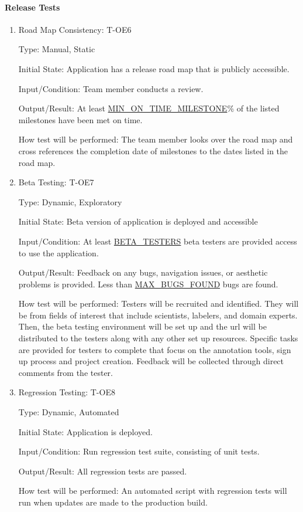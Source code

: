 \documentclass[12pt, titlepage]{article}
\begin{document}
\paragraph{Release Tests}

\begin{enumerate}

\item{Road Map Consistency: T-OE6\\}

Type: Manual, Static
					
Initial State: Application has a release road map that is publicly accessible.
					
Input/Condition: Team member conducts a review.
					
Output/Result: At least \hyperref[MIN_ON_TIME_MILESTONE]{MIN\_ON\_TIME\_MILESTONE}\% of the listed milestones have been met on time.
					
How test will be performed: The team member looks over the road map and cross references the completion date of milestones to the dates listed in the road map.

\item{Beta Testing: T-OE7\\}

Type: Dynamic, Exploratory
					
Initial State: Beta version of application is deployed and accessible
					
Input/Condition: At least \hyperref[BETA_TESTERS]{BETA\_TESTERS} beta testers are provided access to use the application.
					
Output/Result: Feedback on any bugs, navigation issues, or aesthetic problems is provided. Less than \hyperref[MAX_BUGS_FOUND]{MAX\_BUGS\_FOUND} bugs are found.
					
How test will be performed: Testers will be recruited and identified. They will be from fields of interest that include scientists, labelers, and domain experts. Then, the beta testing environment will be set up and the url will be distributed to the testers along with any other set up resources. Specific tasks are provided for testers to complete that focus on the annotation tools, sign up process and project creation. Feedback will be collected through direct comments from the tester.

\item{Regression Testing: T-OE8\\}

Type: Dynamic, Automated
					
Initial State: Application is deployed.
					
Input/Condition: Run regression test suite, consisting of unit tests.
					
Output/Result: All regression tests are passed.
					
How test will be performed: An automated script with regression tests will run when updates are made to the production build.

\end{enumerate}
\end{document}
